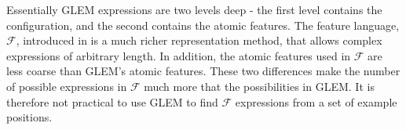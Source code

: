 Essentially GLEM expressions are two levels deep - the first level contains the configuration, and the second contains the atomic features.  The feature language, $\mathcal{F}$, introduced in  is a much richer representation method, that allows complex expressions of arbitrary length.  In addition, the atomic features used in $\mathcal{F}$ are less coarse than GLEM's atomic features.  These two differences make the number of possible expressions in $\mathcal{F}$ much more that the possibilities in GLEM.  It is therefore not practical to use GLEM to find $\mathcal{F}$ expressions from a set of example positions.    
%
% 

